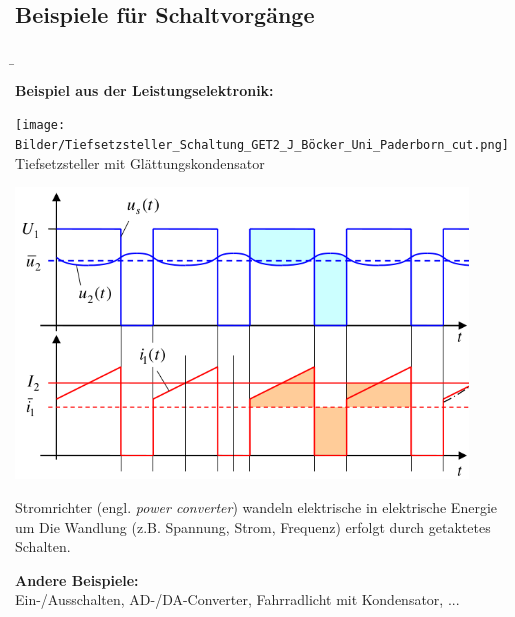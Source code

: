 \subsection{Beispiele für Schaltvorgänge}
\label{sec:einfuehrung:beispieleschaltvorgaenge}
\begin{frame}\ftx{\subsecname}
\b{%
\textbf{Beispiel aus der Leistungselektronik:} 

\begin{minipage}{0.38\textwidth}\centering
	\texttt{[image: Bilder/Tiefsetzsteller\_Schaltung\_GET2\_J\_Böcker\_Uni\_Paderborn\_cut.png]}
	Tiefsetzsteller mit Glättungskondensator\footnotemark
\end{minipage}%
\begin{minipage}{0.58\textwidth}\centering
	\includegraphics[width=0.9\textwidth]{Bilder/Tiefsetzsteller_Zeitverläufe_GET2_J_Böcker_Uni_Paderborn_cut_edit.png}
\end{minipage}

Stromrichter (engl. \textit{power converter}) wandeln elektrische in elektrische Energie um 
Die Wandlung (z.B. Spannung, Strom, Frequenz) erfolgt durch getaktetes Schalten.\vspace{5pt}

\textbf{Andere Beispiele:}\\
Ein-/Ausschalten, AD-/DA-Converter, Fahrradlicht mit Kondensator, ...
}%
\end{frame}
